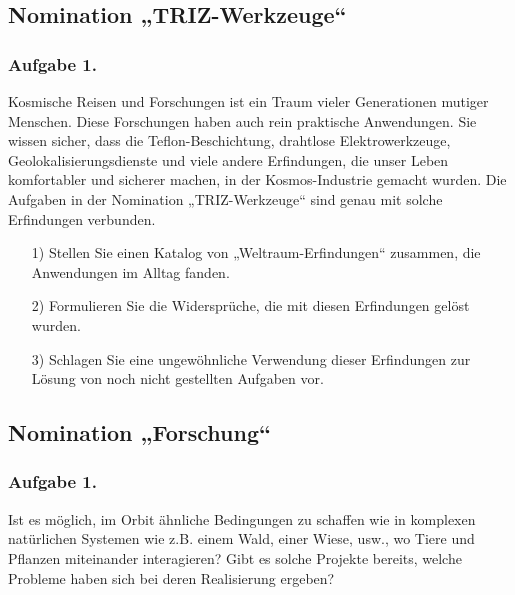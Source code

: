 \documentclass[11pt,a4paper]{article}
\begin{document}
\subsection{Nomination „TRIZ-Werkzeuge“}

\subsubsection*{Aufgabe 1.}

\newcommand{\CosmicInventions}{Kosmische Reisen und Forschungen ist ein Traum
  vieler Generationen mutiger Menschen. Diese Forschungen haben auch rein
  praktische Anwendungen. Sie wissen sicher, dass die Teflon-Beschichtung,
  drahtlose Elektrowerkzeuge, Geolokalisierungsdienste und viele andere
  Erfindungen, die unser Leben komfortabler und sicherer machen, in der
  Kosmos-Industrie gemacht wurden. Die Aufgaben in der Nomination
  „TRIZ-Werkzeuge“ sind genau mit solche Erfindungen verbunden.
\begin{itemize}[noitemsep]
\item[1)] Stellen Sie einen Katalog von „Weltraum-Erfindungen“ zusammen, die
  Anwendungen im Alltag fanden.
\item[2)] Formulieren Sie die Widersprüche, die mit diesen Erfindungen gelöst
  wurden.
\item[3)] Schlagen Sie eine ungewöhnliche Verwendung dieser Erfindungen zur
  Lösung von noch nicht gestellten Aufgaben vor.
\end{itemize}}

\CosmicInventions

\subsection{Nomination „Forschung“}

\subsubsection*{Aufgabe 1.}

\AnimalsInCosmos

Ist es möglich, im Orbit ähnliche Bedingungen zu schaffen wie in komplexen
natürlichen Systemen wie z.B. einem Wald, einer Wiese, usw., wo Tiere und
Pflanzen miteinander interagieren?  Gibt es solche Projekte bereits,
welche Probleme haben sich bei  deren Realisierung ergeben?  
\end{document}
